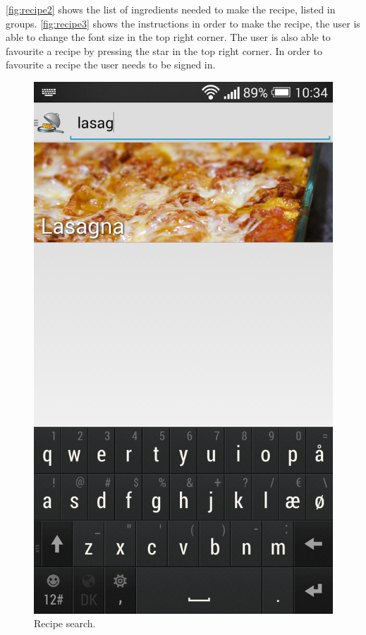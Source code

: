 \autoref{fig:recipe2} shows the list of ingredients needed to make the recipe, listed in groups. \autoref{fig:recipe3} shows the instructions in order to make the recipe, the user is able to change the font size in the top right corner. The user is also able to favourite a recipe by pressing the star in the top right corner. In order to favourite a recipe the user needs to be signed in.

\begin{figure}[H]
\begin{minipage}[t]{0.5\columnwidth}
\centering
\includegraphics[width=0.7\columnwidth]{img/screenshots/finalrecipesearch.png}
\caption{Recipe search\label{fig:recipesearch}.}
\end{minipage}
\hspace{0.5cm}
\begin{minipage}[t]{0.5\columnwidth}
\centering

\end{minipage}
\end{figure}
